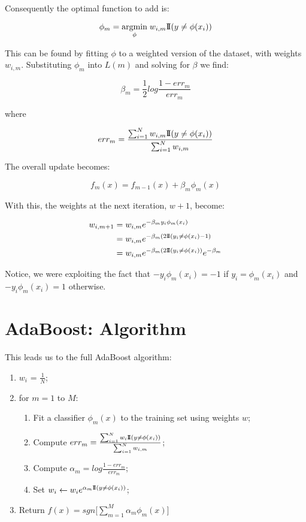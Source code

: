 \documentclass[a4paper, 12pt]{article}
\begin{document}
Consequently the optimal function to add is:

  $$ \phi_m = \underset{\phi}{\mathrm{argmin}}\; w_{i,m} {\rm I\!I}(y \ne \phi(x_i)) $$

This can be found by fitting $\phi$ to a weighted version of the dataset, with weights $w_{i,m}$. Substituting $\phi_m$ into $L(m)$ and solving for $\beta$ we find:

  $$ \beta_m = \frac12 log \frac{1-err_m}{err_m} $$

where

  $$ err_m = \frac{\sum_{i=1}^N w_{i,m} {\rm I\!I}(y \ne \phi(x_i))}{\sum_{i=1}^N w_{i,m}} $$

The overall update becomes:

  $$ f_m(x) = f_{m-1}(x) + \beta_m \phi_m(x) $$

\vspace{1em}
With this, the weights at the next iteration, $w+1$, become:

\begin{align*}
  w_{i,m+1} &= w_{i,m} e^{-\beta_m y_i \phi_m(x_i)} \\
            &= w_{i,m} e^{-\beta_m (2{\rm I\!I}(y_i \ne \phi(x_i)-1)} \\
            &= w_{i,m} e^{-\beta_m (2{\rm I\!I}(y_i \ne \phi(x_i))} e^{-\beta_m}
\end{align*}

Notice, we were exploiting the fact that $-y_i\phi_m(x_i) = -1$ if $y_i = \phi_m(x_i)$ and $-y_i\phi_m(x_i) = 1$ otherwise.

\newpage
\section*{AdaBoost: Algorithm}
This leads us to the full AdaBoost algorithm:

\begin{enumerate}
  \item $w_i$ = $\frac1N$;
  \item for $m=1$ to $M$:
    \begin{enumerate}
      \item Fit a classifier $\phi_m(x)$ to the training set using weights $w$;
      \item Compute $err_m = \frac{\sum_{i=1}^N w_i {\rm I\!I}(y \ne \phi(x_i))}{\sum_{i=1}^N w_{i,m}}$;
      \item Compute $\alpha_m = log \frac{1-err_m}{err_m}$;
      \item Set $w_i \leftarrow w_i e^{\alpha_m {\rm I\!I}(y \ne \phi(x_i))}$;
    \end{enumerate}
  \item Return $f(x) = sgn \big[\sum_{m=1}^M \alpha_m \phi_m(x) \big]$
\end{enumerate}
\end{document}
